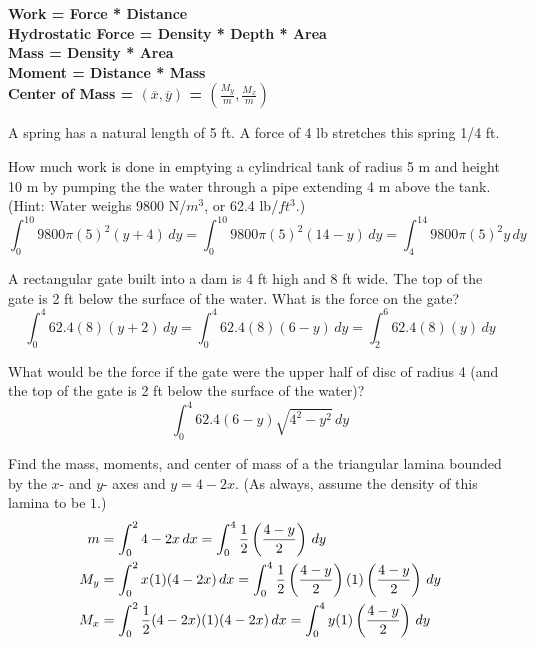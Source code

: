 \documentclass[12pt]{exam}
\begin{document}
\textbf{\hspace{-.3in}
Work = Force * Distance \\
Hydrostatic Force = Density * Depth * Area\\
Mass = Density * Area\\
Moment = Distance * Mass\\
Center of Mass = $(\overline{x},\overline{y})$ = $\left(\frac{M_y}{m},
\frac{M_x}{m}\right)$
}

\begin{questions}

\question A spring has a natural length of 5 ft.  A force of
4 lb stretches this spring 1/4 ft.  

\question How much work is done in emptying a cylindrical tank of 
radius 5 m and height 10 m by pumping the the water through a 
pipe extending 4 m above the tank.  (Hint: Water weighs 9800 N/$m^3$, or
62.4 lb/$ft^3$.)
\[
\int_0^{10} 9800 \pi(5)^2 (y+4) \, dy = 
\int_0^{10} 9800 \pi(5)^2 (14-y) \, dy =
\int_4^{14} 9800 \pi(5)^2 y \, dy
\]

\question A rectangular gate built into a dam is 4 ft high and 8 ft wide.
The top of the gate is 2 ft below the surface of the water.  What is the 
force on the gate?
\[
\int_0^4 62.4(8)(y+2) \,dy =
\int_0^4 62.4(8)(6-y)\, dy=
\int_2^6 62.4(8)(y) \,dy
\]

\question What would be  the force if the gate were the upper half of disc of
radius 4 (and the top of the gate is 2 ft below the surface of the water)?
\[
\int_0^4  62.4 (6-y)\sqrt{4^2 - y^2} \, dy
\]

\question Find the mass, moments, and center of mass of a the
triangular lamina bounded by the $x$- and $y$- axes and $y=4-2x$.
(As always, assume the density of this lamina to be $1$.)
\begin{align}\notag
m&=\int_0^2 4-2x\,dx 
=\int_0^4 \frac{1}{2}\left(\frac{4-y}{2}\right) \,dy \\\notag
M_y&=\int_0^2 x(1)(4-2x)\, dx
=\int_0^4 \frac{1}{2}\left(\frac{4-y}{2}\right)(1)
\left(\frac{4-y}{2}\right)\,dy \\\notag
M_x&=\int_0^2 \frac{1}{2}(4-2x) (1) (4-2x)\,dx 
=\int_0^4 y(1)\left(\frac{4-y}{2}\right)\,dy \\\notag
\end{align}



\end{questions}
\end{document}
